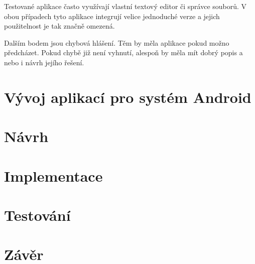     Testované aplikace často využívají vlastní textový editor či správce souborů. V obou případech tyto aplikace integrují velice jednoduché verze a jejich použitelnost je tak značně omezená.

    Dalším bodem jsou chybová hlášení. Těm by měla aplikace pokud možno předcházet. Pokud chybě již není vyhnutí, alespoň by měla mít dobrý popis a nebo i návrh jejího řešení.

\chapter{Vývoj aplikací pro systém Android}
\chapter{Návrh}
\chapter{Implementace}
\chapter{Testování}
\chapter{Závěr}